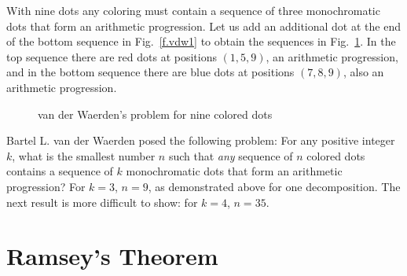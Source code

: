 With nine dots any coloring must contain a sequence of three monochromatic dots that form an arithmetic progression. Let us add an additional dot at the end of the bottom sequence in Fig.~\ref{f.vdw1} to obtain the sequences in Fig.~\ref{f.vdw2}. In the top sequence there are red dots at positions $(1,5,9)$, an arithmetic progression, and in the bottom sequence there are blue dots at positions $(7,8,9)$, also an arithmetic progression.
\begin{figure}[htb]
\begin{center}
\end{center}
\caption{van der Waerden's problem for nine colored dots}\label{f.vdw2}
\end{figure}


Bartel L. van der Waerden posed the following problem: For any positive integer $k$, what is the smallest number $n$ such that \emph{any} sequence of $n$ colored dots contains a sequence of $k$ monochromatic dots that form an arithmetic progression? For $k=3$, $n=9$, as demonstrated above for one decomposition. The next result is more difficult to show: for $k=4$, $n=35$.




\section{Ramsey's Theorem}\label{s.ramsey}

